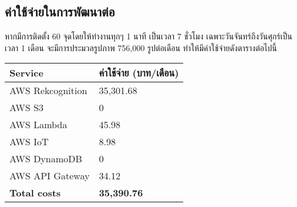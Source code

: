\subsection{ค่าใช้จ่ายในการพัฒนาต่อ}
หากมีการติดตั้ง 60 จุดโดยให้ทำงานทุกๆ 1 นาที เป็นเวลา 7 ชั่วโมง เฉพาะวันจันทร์ถึงวันศุกร์เป็นเวลา 1 เดือน จะมีการประมวลรูปภาพ 756,000 รูปต่อเดือน ทำให้มีค่าใช้จ่ายดังตารางต่อไปนี้

 \begin{center}
    \begin{tabular}{ | m{5cm} | m{4cm}| } 
      \hline
      \textbf{Service} & \textbf{ค่าใช้จ่าย (บาท/เดือน)} \\ 
      \hline
      AWS Rekcognition & 35,301.68\\ 
      \hline
      AWS S3 & 0\\
      \hline
      AWS Lambda & 45.98\\
      \hline
      AWS IoT & 8.98\\
      \hline
      AWS DynamoDB & 0\\
      \hline
      AWS API Gateway & 34.12\\
      \hline
      \textbf{Total costs} & \textbf{35,390.76}\\
      \hline
    \end{tabular}
    \end{center}